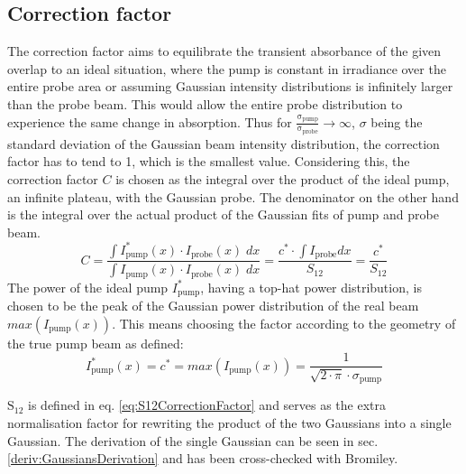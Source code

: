 \documentclass[twoside,openright,listof=numbered]{scrreprt}
\begin{document}
\subsection{Correction factor}\label{sec:CorrFactor}
The correction factor aims to equilibrate the transient absorbance of the given  overlap to an ideal situation, where the pump is constant in irradiance over the entire probe area or assuming Gaussian intensity distributions is infinitely larger than the probe beam. This would allow the entire probe distribution to experience the same change in absorption.
Thus for $\mathrm{\frac{\sigma_\text{pump}}{\sigma_\text{probe}} \rightarrow \infty}$, $\sigma$ being the standard deviation of the Gaussian beam intensity distribution, the correction factor has to tend to 1, which is the smallest value.
Considering this, the correction factor $C$ is chosen as the integral over the product of the ideal pump, an infinite plateau, with the Gaussian probe. The denominator on the other hand is the integral over the actual product of the Gaussian fits of pump and probe beam.  
\begin{equation}\label{eq:CorrFactorGaussians} 
C = \dfrac{\int I_\text{pump}^*(x)\cdot I_\text{probe}(x) \;dx}{\int I_\text{pump}(x)\cdot I_\text{probe}(x) \; dx} = \dfrac{c^*\cdot \int I_\text{probe} dx}{S_{12}} = \dfrac{c^*}{S_{12}}
\end{equation}
The power of the ideal pump $I^*_\text{pump}$, having a top-hat power distribution, is chosen to be the peak of the Gaussian power distribution of the real beam $max\left(I_\text{pump}(x)\right)$. This means choosing the factor according to the geometry of the true pump beam as defined:
\begin{equation*}\label{eq:maxPowerGauss}
I_\text{pump}^*(x) = c^* = max(I_\text{pump}(x)) = \frac{1}{\sqrt{2\cdot\pi}\cdot\sigma_\text{pump}}
\end{equation*}

$\mathrm{S_{12}}$ is defined in eq. \ref{eq:S12CorrectionFactor} and serves as the extra normalisation factor for rewriting the product of the two Gaussians into a single Gaussian. The derivation of the single Gaussian can be seen in sec. \ref{deriv:GaussiansDerivation} and has been cross-checked with Bromiley.\cite{Bromiley2014}
\end{document}
